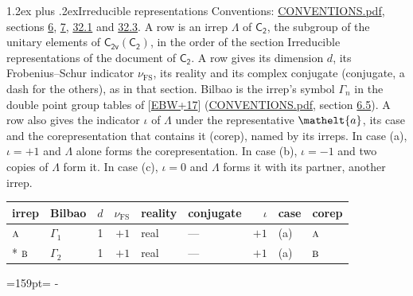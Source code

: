 \documentclass[10pt,a4paper]{article}
\makeatletter
\renewcommand\section{\@startsection{section}{1}{\z@}{-3ex plus -1ex minus -.2ex}%
  {1.2ex plus .2ex}{\normalfont\large\sffamily\bfseries\color{parttitle}}}
\newcommand{\needspace}[1]{\par\penalty-100\begingroup\dimen0=#1\relax\dimen2=\pagegoal
  \advance\dimen2-\pagetotal\ifdim\dimen0>\dimen2\relax\ifdim\dimen2>0pt\vfil\break\fi\fi
  \endgroup}
\numberwithin{equation}{section}
\newcommand{\eltfont}[1]{{\let\sigma\eltsigma\mathelt{#1}}}
\newcommand{\grp}[1]{\mathsf{#1}}
\newcommand{\irr}[1]{\text{\normalfont\scshape #1}}
\newcommand{\elt}[1]{\eltfont{#1}}
\newcommand{\fsind}{\nu_{\mathrm{FS}}}
\makeatother
\begin{document}
\section{Irreducible representations}\label{s:irreps}
Conventions: \href{../../CONVENTIONS.pdf}{CONVENTIONS.pdf}, sections \href{../../../rotation/CONVENTIONS.pdf\#conv.6}{6}, \href{../../../rotation/CONVENTIONS.pdf\#conv.7}{7}, \href{../../CONVENTIONS.pdf\#conv.32.1}{32.1} and \href{../../CONVENTIONS.pdf\#conv.32.3}{32.3}.
\leavevmode\label{n:irrep.Delta}A row is an irrep $\Lambda$ of $\grp{C_{2}}$, the subgroup of the unitary elements of $\grp{C_{2v}}(\grp{C_{2}})$, in the order of the section Irreducible representations of the document of \href{../../../rotation/data/pdf/C2.pdf}{$\grp{C_{2}}$}. \label{n:index.dimension}\label{n:index.frobenius}\label{n:head.irrep}\label{n:head.reality}\label{n:head.conjugate}A row gives its dimension $d$, its Frobenius--Schur indicator $\fsind$, its reality and its complex conjugate (conjugate, a dash for the others), as in that section. \label{n:head.bilbao}\label{n:irrep.alias.gamma}Bilbao is the irrep's symbol $\Gamma_n$ in the double point group tables of [\href{../../../REFERENCES.pdf\#ref.EBW+17}{EBW+17}] (\href{../../CONVENTIONS.pdf}{CONVENTIONS.pdf}, section \href{../../../rotation/CONVENTIONS.pdf\#conv.6.5}{6.5}). \label{n:head.case.corep}\label{n:head.corep}A row also gives the indicator $\iota$ of $\Lambda$ under the representative $\elt{a}$, its case and the corepresentation that contains it (corep), named by its irreps. In case (a), $\iota = +1$ and $\Lambda$ alone forms the corepresentation. In case (b), $\iota = -1$ and two copies of $\Lambda$ form it. In case (c), $\iota = 0$ and $\Lambda$ forms it with its partner, another irrep.
\setlength{\emergencystretch}{2em}\par\setlength{\emergencystretch}{0pt}
{\small\renewcommand{\arraystretch}{1.25}\setlength{\tabcolsep}{4pt}\begin{longtable}{@{}llrrllrll@{}}\toprule
irrep & Bilbao & $d$ & $\fsind$ & reality & conjugate & $\iota$ & case & corep\\\midrule\endhead
\bottomrule\endfoot\endlastfoot
$\irr{a}$ & $\Gamma_{1}$ & 1 & $+1$ & real & --- & $+1$ & (a) & $\irr{a}$\\*
$\irr{b}$ & $\Gamma_{2}$ & 1 & $+1$ & real & --- & $+1$ & (a) & $\irr{b}$\\
\bottomrule\end{longtable}}
\needspace{159pt}
\end{document}
